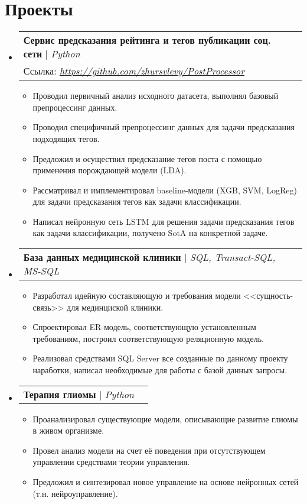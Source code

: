 \documentclass[letterpaper,11pt]{article}
\makeatletter
\newcommand{\resumeItem}[1]{
  \item\small{
    {#1 \vspace{-2pt}}
  }
}
\newcommand{\resumeProjectHeading}[2]{
    \item
    \begin{tabular*}{1.001\textwidth}{l@{\extracolsep{\fill}}r}
      \small#1 & \textbf{\small #2}\\
    \end{tabular*}\vspace{-7pt}
}
\newcommand{\resumeProjectHeadinghref}[4]{
    \item
    \begin{tabular*}{1.001\textwidth}{l@{\extracolsep{\fill}}r}
      \small#1 & \textbf{\small #2}\\
      \small#3 & \textbf{\small #4}\\
    \end{tabular*}\vspace{-7pt}
}
\newcommand{\resumeSubHeadingListStart}{\begin{itemize}[leftmargin=0.0in, label={}]}
\newcommand{\resumeSubHeadingListEnd}{\end{itemize}}
\newcommand{\resumeItemListStart}{\begin{itemize}}
\newcommand{\resumeItemListEnd}{\end{itemize}\vspace{-5pt}}
\makeatother
\begin{document}
\section{Проекты}
    \vspace{-5pt}
    \resumeSubHeadingListStart
      \resumeProjectHeadinghref
          {\textbf{Сервис предсказания рейтинга и тегов публикации соц. сети} $|$ \emph{Python}}{}
          {Ссылка: \href{https://github.com/zhursvlevy/PostProcessor}{\textit{https://github.com/zhursvlevy/PostProcessor}}}{}
          \resumeItemListStart
            \resumeItem{Проводил первичный анализ исходного датасета, выполнял базовый препроцессинг данных.}
            \resumeItem{Проводил специфичный препроцессинг данных для задачи предсказания подходящих тегов.}
            \resumeItem{Предложил и осуществил предсказание тегов поста с помощью применения порождающей модели (LDA).}
            \resumeItem{Рассматривал и имплементировал baseline-модели (XGB, SVM, LogReg) для задачи предсказания тегов как задачи классификации.}
            \resumeItem{Написал нейронную сеть LSTM для решения задачи предсказания тегов как задачи классификации, получено SotA на конкретной задаче.}
          \resumeItemListEnd
          \vspace{-13pt}
      \resumeProjectHeading
          {\textbf{База данных медицинской клиники} $|$ \emph{SQL, Transact-SQL, MS-SQL}}{}
          \resumeItemListStart
            \resumeItem{Разработал идейную составляющую и требования модели <<сущность-связь>> для мединциской клиники.}
            \resumeItem{Спроектировал ER-модель, соответствующую установленным требованиям, построил соответствующую реляционную модель.}
            \resumeItem{Реализовал средствами SQL Server все созданные по данному проекту наработки, написал необходимые для работы с базой данных запросы.}
          \resumeItemListEnd 
          \vspace{-13pt}
        \resumeProjectHeading
          {\textbf{Терапия глиомы} $|$ \emph{Python}}{}
          \resumeItemListStart
            \resumeItem{Проанализировал существующие модели, описывающие развитие глиомы в живом организме.}
            \resumeItem{Провел анализ модели на счет её поведения при отсутствующем управлении средствами теории управления.}
            \resumeItem{Предложил и синтезировал новое управление на основе нейронных сетей (т.н. нейроуправление).}
          \resumeItemListEnd 
          \vspace{-13pt}
    \resumeSubHeadingListEnd
\vspace{-15pt}
\end{document}

